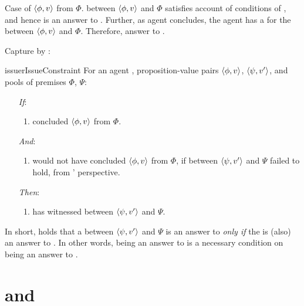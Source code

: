 \begin{note}
  Case of \(\langle \phi, v \rangle\) from \(\Phi\).
  \ros{} between \(\langle \phi, v \rangle\) and \(\Phi\) satisfies account of conditions of \qWhyV{}, and hence is an answer to \qWhyV{}.
  Further, as agent concludes, the agent has a  for the \ros{} between \(\langle \phi, v \rangle\) and \(\Phi\).
  Therefore, answer to \qHowV{}.

  Capture by \issueConstraint{}:

  \begin{restatable}[\issueConstraint{}]{issue}{rIssueConstraint}
    \label{issue:has-witnessed}
    For an agent \vAgent{}, proposition-value pairs \(\langle \phi, v \rangle\), \(\langle \psi, v' \rangle\), and pools of premises \(\Phi\), \(\Psi\):

    \begin{enumerate}
    \item[\emph{If}:]
      \begin{enumerate}[label=\alph*., ref=(\alph*)]
      \item \vAgent{} concluded \(\langle \phi, v \rangle\) from \(\Phi\).
      \end{enumerate}
    \item[\emph{And}:]
      \begin{enumerate}[label=\alph*., ref=(\alph*), resume]
      \item
        \vAgent{} would not have concluded \(\langle \phi, v \rangle\) from \(\Phi\), if \support{} between \(\langle \psi, v' \rangle\) and \(\Psi\) failed to hold, from \vAgent{}' perspective.
      \end{enumerate}
    \item[\emph{Then}:]
      \begin{enumerate}[label=\alph*., ref=(\alph*), resume]
      \item
        \vAgent{} has witnessed \support{} between \(\langle \psi, v' \rangle\) and \(\Psi\).
      \end{enumerate}
    \end{enumerate}
    \vspace{-\baselineskip}
  \end{restatable}
  In short, \issueConstraint{} holds that a \ros{} between \(\langle \psi, v' \rangle\) and \(\Psi\) is an answer to \qWhyV{} \emph{only if} the \ros{} is (also) an answer to \qHowV{}.
  In other words, being an answer to \qHowV{} is a necessary condition on being an answer to \qWhyV{}.
\end{note}

\section{ and \qWhy{}}
\label{cha:clarification:sec:support-qWhy}
\label{cha:clar:expand:qWhy}

